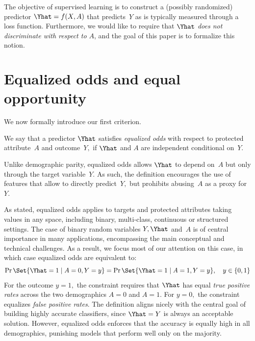 The objective of supervised learning is to construct a (possibly randomized)
predictor $\Yhat=f(X, A)$ that predicts~$Y$ as is typically measured through a
loss function. Furthermore, we would like to require that $\Yhat$ {\em does not
discriminate with respect to $A$}, and the goal of this paper is to formalize
this notion.


\section{Equalized odds and equal opportunity}
%
We now formally introduce our first criterion.
%
\begin{definition}
We say that a predictor $\Yhat$ satisfies \emph{equalized odds} with
respect to protected attribute~$A$ and outcome~$Y,$ if
$\Yhat$ and $A$ are independent conditional on~$Y.$
\end{definition}
%
Unlike demographic parity, equalized odds allows $\Yhat$ to depend
on~$A$ but only through the target variable~$Y.$ As such, the
definition encourages the use of features that allow to directly
predict~$Y,$ but prohibits abusing~$A$ as a proxy for~$Y.$

As stated, equalized odds applies to targets and protected attributes taking
values in any space, including binary, multi-class, continuous or structured
settings.  The case of binary random variables $Y,\Yhat$ and~$A$ is of central
importance in many applications, encompassing the main conceptual and technical
challenges. As a result, we focus most of our attention on this case, in which
case equalized odds are equivalent to:
\[
\Pr\Set{\Yhat=1\mid A=0, Y=y} = \Pr\Set{\Yhat=1\mid A=1, Y=y}
,\quad y\in\{0,1\}
\]
For the outcome $y=1,$ the constraint requires that $\Yhat$ has equal \emph{true
  positive rates} across the two demographics $A=0$ and $A=1.$ For
$y=0,$ the constraint equalizes \emph{false positive rates}.  The
definition aligns nicely with the central goal of building highly
accurate classifiers, since $\Yhat=Y$ is always an acceptable
solution. However, equalized odds enforces that the accuracy is
equally high in all demographics, punishing models that perform
well only on the majority.

